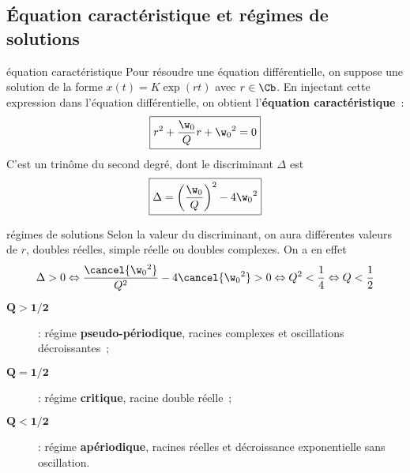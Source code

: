 \documentclass[../main/main.tex]{subfiles}
\begin{document}
\subsection{Équation caractéristique et régimes de solutions}
\begin{tcbraster}[raster columns=2, raster equal height=rows]
    \begin{defi}[label=def:eqcarac]{équation caractéristique}
        Pour résoudre une équation différentielle, on suppose une solution de la
        forme $x(t) = K\exp(rt)$ avec $r \in \Cb$. En injectant cette
        expression dans l'équation différentielle, on obtient l'\textbf{équation
        caractéristique}~:
        \begin{equation*}
            \boxed{r^2 + \frac{\w_0}{Q}r + \w_0{}^2 = 0}
        \end{equation*}
        C'est un trinôme du second degré, dont le discriminant $\Delta$ est
        \begin{equation*}
            \boxed{\Delta = \left( \frac{\w_0}{Q} \right)^2 - 4\w_0{}^2}
        \end{equation*}
    \end{defi}
    \begin{impl}[label=impl:eqcarac]{régimes de solutions}
        Selon la valeur du discriminant, on aura différentes valeurs de $r$,
        doubles réelles, simple réelle ou doubles complexes. On a en effet
        \begin{gather*}
            \Delta > 0
            \Leftrightarrow
            \frac{\cancel{\w_0{}^2}}{Q^2} - 4\cancel{\w_0{}^2} > 0
            \Leftrightarrow
            Q^2 < \frac{1}{4}
            \Leftrightarrow
            Q < \frac{1}{2}
        \end{gather*}
        \begin{description}
            \item[$\mathbf{Q > 1/2}$] : régime \textbf{pseudo-périodique},
                racines complexes et oscillations décroissantes~;
            \item[$\mathbf{Q = 1/2}$] : régime \textbf{critique}, racine double
                réelle~;
            \item[$\mathbf{Q < 1/2}$] : régime \textbf{apériodique}, racines
                réelles et décroissance exponentielle sans oscillation.
        \end{description}
    \end{impl}
\end{tcbraster}
\end{document}
